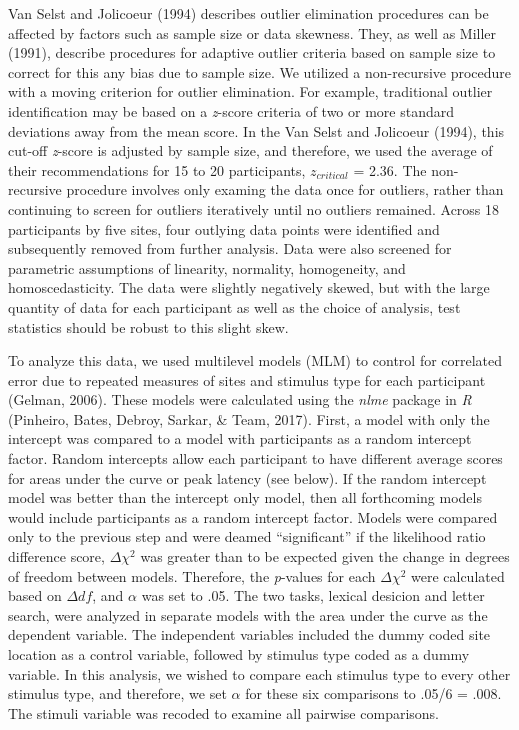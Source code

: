 \documentclass[english,man]{apa6}
\theoremstyle{definition}
\theoremstyle{definition}
\theoremstyle{definition}
\theoremstyle{remark}
\begin{document}
Van Selst and Jolicoeur (1994) describes outlier elimination procedures
can be affected by factors such as sample size or data skewness. They,
as well as Miller (1991), describe procedures for adaptive outlier
criteria based on sample size to correct for this any bias due to sample
size. We utilized a non-recursive procedure with a moving criterion for
outlier elimination. For example, traditional outlier identification may
be based on a \emph{z}-score criteria of two or more standard deviations
away from the mean score. In the Van Selst and Jolicoeur (1994), this
cut-off \emph{z}-score is adjusted by sample size, and therefore, we
used the average of their recommendations for 15 to 20 participants,
\(z_{critical}\) = 2.36. The non-recursive procedure involves only
examing the data once for outliers, rather than continuing to screen for
outliers iteratively until no outliers remained. Across 18 participants
by five sites, four outlying data points were identified and
subsequently removed from further analysis. Data were also screened for
parametric assumptions of linearity, normality, homogeneity, and
homoscedasticity. The data were slightly negatively skewed, but with the
large quantity of data for each participant as well as the choice of
analysis, test statistics should be robust to this slight skew.

To analyze this data, we used multilevel models (MLM) to control for
correlated error due to repeated measures of sites and stimulus type for
each participant (Gelman, 2006). These models were calculated using the
\emph{nlme} package in \emph{R} (Pinheiro, Bates, Debroy, Sarkar, \&
Team, 2017). First, a model with only the intercept was compared to a
model with participants as a random intercept factor. Random intercepts
allow each participant to have different average scores for areas under
the curve or peak latency (see below). If the random intercept model was
better than the intercept only model, then all forthcoming models would
include participants as a random intercept factor. Models were compared
only to the previous step and were deamed \enquote{significant} if the
likelihood ratio difference score, \(\Delta\chi^2\) was greater than to
be expected given the change in degrees of freedom between models.
Therefore, the \emph{p}-values for each \(\Delta\chi^2\) were calculated
based on \(\Delta df\), and \(\alpha\) was set to .05. The two tasks,
lexical desicion and letter search, were analyzed in separate models
with the area under the curve as the dependent variable. The independent
variables included the dummy coded site location as a control variable,
followed by stimulus type coded as a dummy variable. In this analysis,
we wished to compare each stimulus type to every other stimulus type,
and therefore, we set \(\alpha\) for these six comparisons to .05/6 =
.008. The stimuli variable was recoded to examine all pairwise
comparisons.
\end{document}
